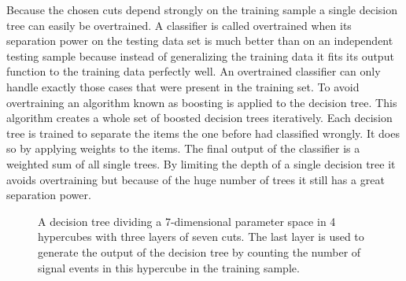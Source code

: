 Because the chosen cuts depend strongly on the training sample a single decision tree can easily be overtrained. A classifier is called overtrained when its separation power on the testing data set is much better than on an independent testing sample because instead of generalizing the training data it fits its output function to the training data perfectly well. An overtrained classifier can only handle exactly those cases that were present in the training set. To avoid overtraining an algorithm known as boosting is applied to the decision tree. This algorithm creates a whole set of boosted decision trees iteratively. Each decision tree is trained to separate the items the one before had classified wrongly. It does so by applying weights to the items. The final output of the classifier is a weighted sum of all single trees. By limiting the depth of a single decision tree it avoids overtraining but because of the huge number of trees it still has a great separation power.

\begin{figure}
  \centering
\caption[Decision Tree.]{A decision tree dividing a 7-dimensional parameter space in 4 hypercubes with three layers of seven cuts. The last layer is used to generate the output of the decision tree by counting the number of signal events in this hypercube in the training sample.}
\label{fig-decision-tree}
\end{figure}


